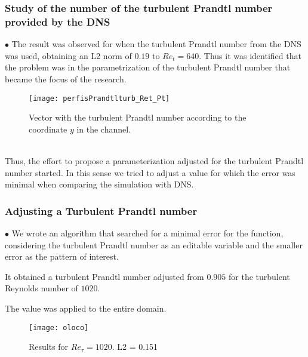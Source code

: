 \documentclass[xcolor=dvipsnames,8pt,aspectratio=34]{beamer}
\begin{document}
	
	
	
		
		\begin{frame}
		\frametitle{Study of the number of the turbulent Prandtl number provided by the DNS}
		\begin{minipage}[h!]{0.45\textwidth}
			$\bullet$ The result was observed for when the turbulent Prandtl number from the DNS was used, obtaining an L2 norm of $ 0.19 $ to $ Re_t = 640 $. Thus it was identified that the problem was in the parametrization of the turbulent Prandtl number that became the focus of the research.
		\end{minipage}\hfill
		\begin{minipage}[h!]{0.45\textwidth}
			\begin{figure}
				\centering
				\texttt{[image: perfisPrandtlturb\_Ret\_Pt]}
				\caption{Vector with the turbulent Prandtl number according to the coordinate $ y $ in the channel.}
			\end{figure}
		\end{minipage}	\\
		Thus, the effort to propose a parameterization adjusted for the turbulent Prandtl number started.
		In this sense we tried to adjust a value for which the error was minimal when comparing the simulation with DNS.
		\end{frame}
	
	
		\begin{frame}
		\frametitle{Adjusting a Turbulent Prandtl number}
		\begin{minipage}[h!]{0.45\textwidth}
			$\bullet$ We wrote an algorithm that searched for a minimal error for the function, considering the turbulent Prandtl number as an editable variable and the smaller error as the pattern of interest.
			
			It obtained a turbulent Prandtl number adjusted from $ 0.905 $ for the turbulent Reynolds number of $ 1020$.
			
			The value was applied to the entire domain.
		\end{minipage}
			\begin{minipage}[h!]{0.2\textwidth}
			\end{minipage}
			\begin{minipage}[h!]{0.45\textwidth}
			\begin{figure}
				\centering
				\texttt{[image: oloco]}
				\caption{Results for $Re_\tau = 1020$. L2 = 0.151}
			\end{figure}
		\end{minipage}	
		\end{frame}
		
\end{document}
